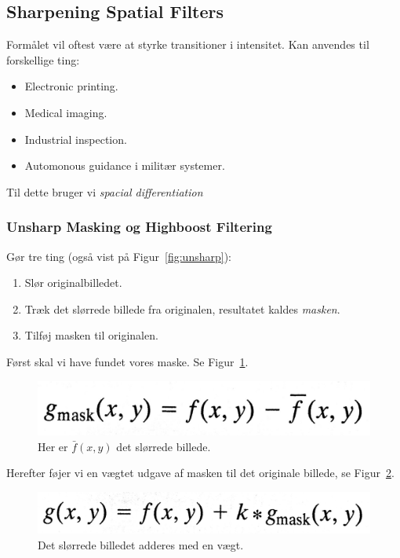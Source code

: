 \subsection{Sharpening Spatial Filters}

Formålet vil oftest være at styrke transitioner i intensitet. Kan anvendes til forskellige ting: 

\begin{itemize}
	\item Electronic printing.
	\item Medical imaging.
	\item Industrial inspection.
	\item Automonous guidance i militær systemer.
\end{itemize}

Til dette bruger vi \textit{spacial differentiation}

\subsubsection{Unsharp Masking og Highboost Filtering}

Gør tre ting (også vist på Figur~\ref{fig:unsharp}): 

\begin{enumerate}
	\item Slør originalbilledet.
	\item Træk det slørrede billede fra originalen, resultatet kaldes \textit{masken}.
	\item Tilføj masken til originalen. 
\end{enumerate}

Først skal vi have fundet vores maske. Se Figur~\ref{fig:unsharpeq1}.

\begin{figure}[H]
	\centering
	\includegraphics[width=0.4\linewidth]{figs/spm02/unsharpeq1}
	\caption{Her er $\bar{f}(x,y)$ det slørrede billede.}
	\label{fig:unsharpeq1}
\end{figure}

Herefter føjer vi en vægtet udgave af masken til det originale billede, se Figur~\ref{fig:unsharpeq2}.

\begin{figure}[H]
	\centering
	\includegraphics[width=0.4\linewidth]{figs/spm02/unsharpeq2}
	\caption{Det slørrede billedet adderes med en vægt.}
	\label{fig:unsharpeq2}
\end{figure}

